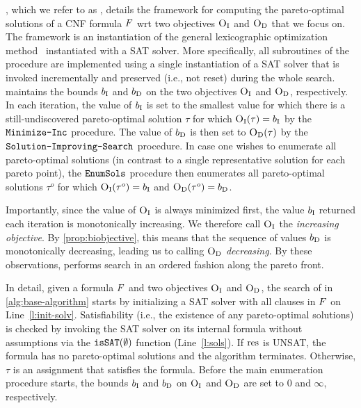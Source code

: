 , which we refer to as \algname{}, details the  framework for computing the pareto-optimal solutions of a CNF formula $F$ wrt 
two objectives $\textsc{O}_{\text{I}}$ and $\textsc{O}_{\text{D}}$ that we focus on. The framework is an instantiation of the general lexicographic optimization method~\autocite{survey}
instantiated with a SAT solver.
More specifically, all subroutines of the procedure are implemented using a single instantiation of a SAT solver that is invoked incrementally and preserved (i.e., not reset)
during the whole search. 
\algname{} maintains the bounds $b_{\text{I}}$ and $b_{\text{D}}$ on the two objectives $\textsc{O}_{\text{I}}$ and $\textsc{O}_{\text{D}}$, respectively.
In each iteration, the value of $b_{\text{I}}$ is set to the smallest value for which there is 
a still-undiscovered pareto-optimal solution $\tau$ for which $\textsc{O}_{\text{I}}(\tau) = b_{\text{I}}$ by the $\texttt{Minimize-\allowbreak{}Inc}$ procedure.
The value of $b_{\text{D}}$ is then set to $\textsc{O}_{\text{D}}(\tau)$ by the $\texttt{Solution-\allowbreak{}Improving-\allowbreak{}Search}$ procedure.
In case one wishes to enumerate all pareto-optimal solutions (in contrast to a single representative solution for each pareto point),
the $\texttt{EnumSols}$ procedure then enumerates all pareto-optimal solutions $\tau^o$ for which $\textsc{O}_{\text{I}}(\tau^o) = b_{\text{I}}$ and $\textsc{O}_{\text{D}}(\tau^o) = b_{\text{D}}$.

Importantly, 
since the value of $\textsc{O}_{\text{I}}$ is always minimized first, the value $b_{\text{I}}$ returned each iteration is monotonically increasing. 
We therefore call $\textsc{O}_{\text{I}}$ the \emph{increasing objective}.
By \cref{prop:biobjective}, this means that the sequence of values $b_{\text{D}}$ is monotonically decreasing, leading us to calling $\textsc{O}_{\text{D}}$ \emph{decreasing}.
By these observations, \algname{} performs search in an ordered fashion along the pareto front.

In detail, given a formula $F$ and two objectives $\textsc{O}_{\text{I}}$ and $\textsc{O}_{\text{D}}$, the search of \algname{} in \cref{alg:base-algorithm} starts by initializing a SAT solver with all clauses in $F$ on Line~\ref{l:init-solv}.
Satisfiability (i.e., the existence of any pareto-optimal solutions) is checked by invoking the SAT solver on its internal formula without assumptions via the
$\texttt{isSAT}(\emptyset)$ function (Line~\ref{l:sols}). If $\text{res}$ is UNSAT, the formula has no pareto-optimal solutions and the algorithm terminates. Otherwise, $\tau$ is an assignment that satisfies the formula. Before the main enumeration procedure starts, the bounds $b_{\text{I}}$ and $b_{\text{D}}$ on $\textsc{O}_{\text{I}}$ and $\textsc{O}_{\text{D}}$ are set to $0$ and $\infty$, respectively.

